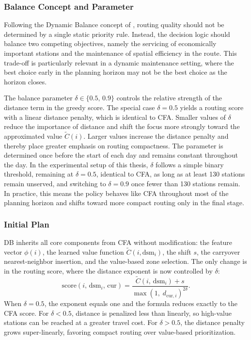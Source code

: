 \documentclass[12pt,oneside]{article}
\begin{document}
\subsubsection*{Balance Concept and Parameter}
Following the Dynamic Balance concept of \citet{stein2025learning}, routing quality should not be determined by a single static priority rule. Instead, the decision logic should balance two competing objectives, namely the servicing of economically important stations and the maintenance of spatial efficiency in the route. This trade-off is particularly relevant in a dynamic maintenance setting, where the best choice early in the planning horizon may not be the best choice as the horizon closes.

The balance parameter $\delta \in \{0.5,\, 0.9\}$ controls the relative strength of the distance term in the greedy score. The special case $\delta = 0.5$ yields a routing score with a linear distance penalty, which is identical to CFA. Smaller values of $\delta$ reduce the importance of distance and shift the focus more strongly toward the approximated value $\tilde{C}(i)$. Larger values increase the distance penalty and thereby place greater emphasis on routing compactness. The parameter is determined once before the start of each day and remains constant throughout the day. In the experimental setup of this thesis, $\delta$ follows a simple binary threshold, remaining at $\delta = 0.5$, identical to CFA, as long as at least 130 stations remain unserved, and switching to $\delta = 0.9$ once fewer than 130 stations remain. In practice, this means the policy behaves like CFA throughout most of the planning horizon and shifts toward more compact routing only in the final stage.

\subsubsection*{Initial Plan}
DB inherits all core components from CFA without modification: the feature vector $\phi(i)$, the learned value function $\tilde{C}(i, \mathrm{dsm}_i)$, the shift $s$, the carryover nearest-neighbor insertion, and the value-based zone selection. The only change is in the routing score, where the distance exponent is now controlled by $\delta$:
\[
  \text{score}(i,\, \mathrm{dsm}_i,\, \mathrm{cur}) = \frac{\tilde{C}(i,\, \mathrm{dsm}_i) + s}{\max(1,\; d_{\mathrm{cur},i})^{2\delta}}.
\]
When $\delta = 0.5$, the exponent equals one and the formula reduces exactly to the CFA score. For $\delta < 0.5$, distance is penalized less than linearly, so high-value stations can be reached at a greater travel cost. For $\delta > 0.5$, the distance penalty grows super-linearly, favoring compact routing over value-based prioritization.
\end{document}
